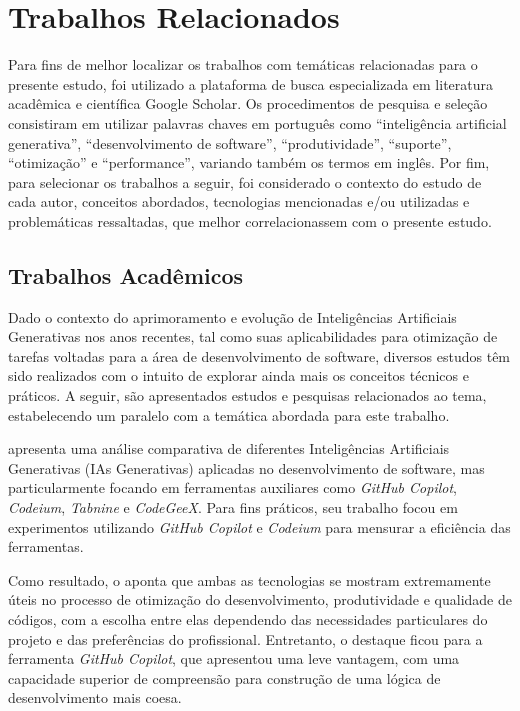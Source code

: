 \documentclass[english,brazilian]{UNISINOSartigo} %
\begin{document}
\section{Trabalhos Relacionados}

Para fins de melhor localizar os trabalhos com temáticas relacionadas para o presente estudo, foi utilizado a plataforma de busca especializada em literatura acadêmica e científica Google Scholar. Os procedimentos de pesquisa e seleção consistiram em utilizar palavras chaves em português como “inteligência artificial generativa”, “desenvolvimento de software”, “produtividade”, “suporte”, “otimização” e “performance”, variando também os termos em inglês. Por fim, para selecionar os trabalhos a seguir, foi considerado o contexto do estudo de cada autor, conceitos abordados, tecnologias mencionadas e/ou utilizadas e problemáticas ressaltadas, que melhor correlacionassem com o presente estudo.

\subsection{Trabalhos Acadêmicos}

Dado o contexto do aprimoramento e evolução de Inteligências Artificiais Generativas nos anos recentes, tal como suas aplicabilidades para otimização de tarefas voltadas para a área de desenvolvimento de software, diversos estudos têm sido realizados com o intuito de explorar ainda mais os conceitos técnicos e práticos. A seguir, são apresentados estudos e pesquisas relacionados ao tema, estabelecendo um paralelo com a temática abordada para este trabalho.

 apresenta uma análise comparativa de diferentes Inteligências Artificiais Generativas (IAs Generativas) aplicadas no desenvolvimento de software, mas particularmente focando em ferramentas auxiliares como \textit{GitHub Copilot}, \textit{Codeium}, \textit{Tabnine} e \textit{CodeGeeX}. Para fins práticos, seu trabalho focou em experimentos utilizando \textit{GitHub Copilot} e \textit{Codeium} para mensurar a eficiência das ferramentas.

Como resultado, o  aponta que ambas as tecnologias se mostram extremamente úteis no processo de otimização do desenvolvimento, produtividade e qualidade de códigos, com a escolha entre elas dependendo das necessidades particulares do projeto e das preferências do profissional. Entretanto, o destaque ficou para a ferramenta \textit{GitHub Copilot}, que apresentou uma leve vantagem, com uma capacidade superior de compreensão para construção de uma lógica de desenvolvimento mais coesa.
\end{document}
